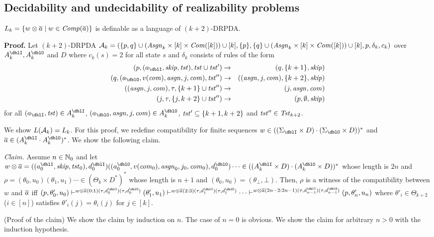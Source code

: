 \subsection{Decidability and undecidability of realizability problems}
\begin{lemma}\label{lem: Lk}
$L_k = \{w\otimes{\overline{a}} \mid w\in{\mathit{Comp}}({\overline{a}})\}$ is definable as a language of $(k+2)$-DRPDA.
\end{lemma}
{\bf Proof.}\quad
Let $(k+2)$-DRPDA ${\cal A}_k = (\{p, q\}\cup(\mathit{Asgn}_k\times[k]\times\mathit{Com}([k]))\cup[k], \{p\}, \{q\}\cup(\mathit{Asgn}_k\times[k]\times\mathit{Com}([k]))\cup[k], p, \delta_k, c_k)$ over $A_k^\dblI, A_k^\dblO$ and $D$ where
$c_k(s)=2$ for all state $s$ and $\delta_k$ consists of rules of the form
\begin{eqnarray}
(p, (a_\dblI, \skip, \tst), \tst\cup\tst') &\to& (q, \{k+1\}, \skip)\label{eq: Lk1}\\
(q, (a_\dblO, v(\com), \asgn, j, \com), \tst'')&\to& ((\asgn,j,\com), \{k+2\},\skip)\label{eq: Lk2}\\
((\asgn,j,\com), \tau, \{k+1\}\cup\tst'')&\to& (j, \asgn, \com)\label{eq: Lk3}\\
(j, \tau, \{j, k+2\}\cup\tst'')&\to& (p, \emptyset, \skip)\label{eq: Lk4}
\end{eqnarray}
for all $(a_\dblI, \tst)\in A_k^\dblI$, $(a_\dblO, \asgn, j, \com)\in A_k^\dblO$, $\mathit{tst}'\subseteq \{k+1,k+2\}$ and $\mathit{tst}''\in\mathit{Tst}_{k+2}$.

We show $L({\cal A}_k) = L_k$.
For this proof, we redefine compatibility for finite sequences $w\in ((\Sigma_\dblI\times D)\cdot (\Sigma_\dblO\times D))^*$ and $\overa\in(A_k^\dblI\cdot A_k^\dblO)^*$.
We show the following claim.
\par\medskip\noindent
{\it Claim.} Assume $n\in\mathbb{N}_0$ and let $w\otimes\overa = ((a^\dblI_0, \skip,\tst_0), d^\dblI_0)((a^\dblO_0,v(\com_0),\asgn_0,j_0, \com_0), d^\dblO_0)\cdots\in ((A_k^\dblI\times D)\cdot(A_k^\dblO\times D))^*$
whose length is $2n$ and
$\rho = (\theta_0,u_0)(\theta_1, u_1)\cdots\in (\Theta_k\times D^*)^*$ whose length is $n+1$ and $(\theta_0, u_0)=(\theta_\bot, \bot)$.
Then,
$\rho$ is a witness of the compatibility between $w$ and ${\overline{a}}$ iff
$(p,\theta'_0,u_0)\vdash^{w\otimes\overa(0:1)(\tau,d^\dblI_{0})(\tau,d^\dblO_{0})}(\theta'_1,u_1)\vdash^{w\otimes\overa(2:3)(\tau,d^\dblI_{1})(\tau,d^\dblO_{1})}\cdots\vdash^{w\otimes\overa(2n-2:2n-1)(\tau,d^\dblI_{n-1})(\tau,d^\dblO_{n-1})}(p,\theta'_{n},u_{n})$
where $\theta'_i\in \Theta_{k+2}$ ($i\in[n]$) satisfies $\theta'_i(j)=\theta_i(j)$ for $j\in[k]$.
\par\medskip\noindent
(Proof of the claim)
We show the claim by induction on $n$.
The case of $n=0$ is obvious.
We show the claim for arbitrary $n>0$ with the induction hypothesis.

